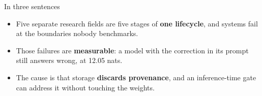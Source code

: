 \documentclass[aspectratio=169]{beamer}
\begin{document}
\begin{frame}{In three sentences}
  \vspace{1.0cm}
  \begin{itemize}\setlength\itemsep{1.3em}
    \item Five separate research fields are five stages of \textbf{one lifecycle},
          and systems fail at the boundaries nobody benchmarks.
    \item Those failures are \textbf{measurable}: a model with the correction in its
          prompt still answers wrong, at 12.05 nats.
    \item The cause is that storage \textbf{discards provenance}, and an inference-time
          gate can address it without touching the weights.
  \end{itemize}
  \vspace{1.2em}
  \begin{center}
  \end{center}
\end{frame}
\end{document}
